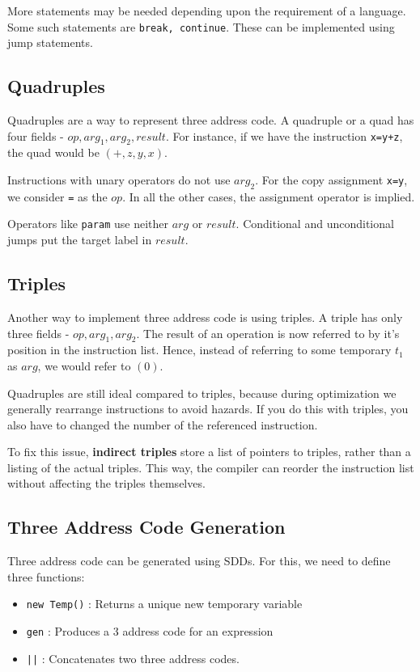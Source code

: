 \documentclass[12pt,letterpaper]{book}
\theoremstyle{definition}
\begin{document}
More statements may be needed depending upon the requirement of a language. Some such statements are \texttt{break, continue}. These can be implemented using jump statements.

\subsection{Quadruples}

Quadruples are a way to represent three address code. A quadruple or a quad has four fields - $op, arg_1, arg_2, result$. For instance, if we have the instruction \texttt{x=y+z}, the quad would be $(+,z,y,x)$.

Instructions with unary operators do not use $arg_2$. For the copy assignment \texttt{x=y}, we consider \texttt{=} as the $op$. In all the other cases, the assignment operator is implied.

Operators like \texttt{param} use neither $arg$ or $result$. Conditional and unconditional jumps put the target label in $result$.

\subsection{Triples}

Another way to implement three address code is using triples. A triple has only three fields - $op,arg_1,arg_2$. The result of an operation is now referred to by it's position in the instruction list. Hence, instead of referring to some temporary $t_1$ as $arg$, we would refer to $(0)$.

Quadruples are still ideal compared to triples, because during optimization we generally rearrange instructions to avoid hazards. If you do this with triples, you also have to changed the number of the referenced instruction.

To fix this issue, \textbf{indirect triples}  store a list of pointers to triples, rather than a listing of the actual triples. This way, the compiler can reorder the instruction list without affecting the triples themselves.

\subsection{Three Address Code Generation}

Three address code can be generated using SDDs. For this, we need to define three functions:

\begin{itemize}
  \item \texttt{new Temp()} : Returns a unique new temporary variable
  \item \texttt{gen} : Produces a 3 address code for an expression
  \item \texttt{||} : Concatenates two three address codes.
\end{itemize}
\end{document}
